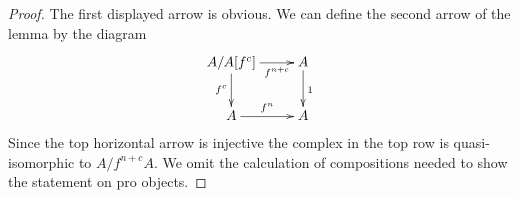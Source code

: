 \documentclass[10pt,a4paper]{amsart}
\theoremstyle{plain}
\theoremstyle{definition}
\theoremstyle{remark}
\numberwithin{equation}{subsection}
\begin{document}
\begin{proof}
The first displayed arrow is obvious. We can define the second arrow of
the lemma by the diagram
$$
\xymatrix{
A/A[f^c] \ar[r]_-{f^{n + c}} \ar[d]_{f^c} & A \ar[d]^1 \\
A \ar[r]^{f^n} & A
}
$$
Since the top horizontal arrow is injective the complex
in the top row is quasi-isomorphic to $A/f^{n + c}A$.
We omit the calculation of compositions needed to show
the statement on pro objects.
\end{proof}
\end{document}

